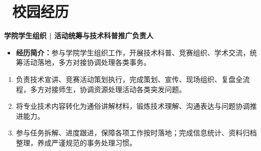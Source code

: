 ﻿\documentclass[10pt,a4paper]{ctexart}
\newcommand{\sect}[2]{%
  \section{\texorpdfstring{\makebox[\widthof{\faGraduationCap}][c]{{\mdseries\color{themecolor}#1}}\ #2}{#2}}
}
\begin{document}
\sect{\faUsers}{校园经历}
\textbf{学院学生组织 | 活动统筹与技术科普推广负责人}
\begin{itemize}
  \item \textbf{经历简介：}参与学院学生组织工作，开展技术科普、竞赛组织、学术交流，统筹活动落地，多方对接协调处理各类事务。
\end{itemize}
\begin{enumerate}
  \item 负责技术宣讲、竞赛活动策划执行，完成策划、宣传、现场组织、复盘全流程，多方对接师生，协调资源处理活动各类突发问题。
  \item 将专业技术内容转化为通俗讲解材料，锻炼技术理解、沟通表达与问题协调推进能力。
  \item 参与任务拆解、进度跟进，保障各项工作按时落地；完成信息统计、资料归档整理，养成严谨规范的事务处理习惯。
\end{enumerate}
\end{document}
